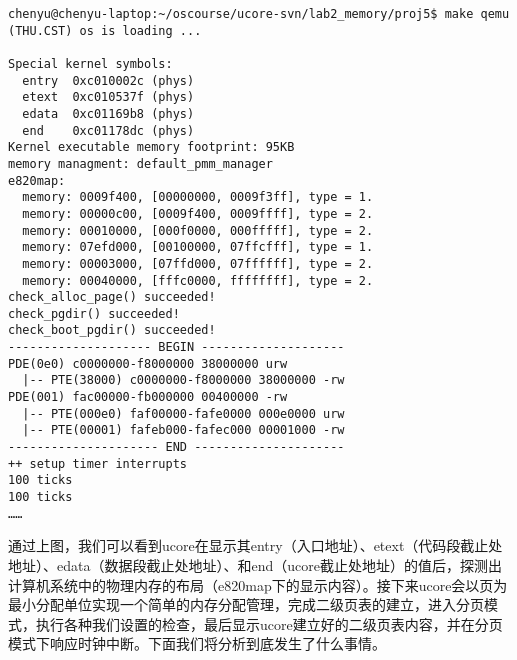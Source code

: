 \begin{lstlisting}
chenyu@chenyu-laptop:~/oscourse/ucore-svn/lab2_memory/proj5$ make qemu
(THU.CST) os is loading ...

Special kernel symbols:
  entry  0xc010002c (phys)
  etext  0xc010537f (phys)
  edata  0xc01169b8 (phys)
  end    0xc01178dc (phys)
Kernel executable memory footprint: 95KB
memory managment: default_pmm_manager
e820map:
  memory: 0009f400, [00000000, 0009f3ff], type = 1.
  memory: 00000c00, [0009f400, 0009ffff], type = 2.
  memory: 00010000, [000f0000, 000fffff], type = 2.
  memory: 07efd000, [00100000, 07ffcfff], type = 1.
  memory: 00003000, [07ffd000, 07ffffff], type = 2.
  memory: 00040000, [fffc0000, ffffffff], type = 2.
check_alloc_page() succeeded!
check_pgdir() succeeded!
check_boot_pgdir() succeeded!
-------------------- BEGIN --------------------
PDE(0e0) c0000000-f8000000 38000000 urw
  |-- PTE(38000) c0000000-f8000000 38000000 -rw
PDE(001) fac00000-fb000000 00400000 -rw
  |-- PTE(000e0) faf00000-fafe0000 000e0000 urw
  |-- PTE(00001) fafeb000-fafec000 00001000 -rw
--------------------- END ---------------------
++ setup timer interrupts
100 ticks
100 ticks
……
\end{lstlisting}

通过上图，我们可以看到ucore在显示其entry（入口地址）、etext（代码段截止处地址）、edata（数据段截止处地址）、和end（ucore截止处地址）的值后，探测出计算机系统中的物理内存的布局（e820map下的显示内容）。接下来ucore会以页为最小分配单位实现一个简单的内存分配管理，完成二级页表的建立，进入分页模式，执行各种我们设置的检查，最后显示ucore建立好的二级页表内容，并在分页模式下响应时钟中断。下面我们将分析到底发生了什么事情。
